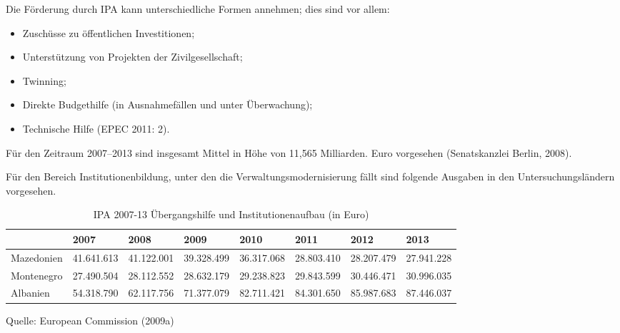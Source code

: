 Die Förderung durch IPA kann unterschiedliche Formen annehmen; dies sind vor allem:
\begin{itemize}
\item Zuschüsse zu öffentlichen Investitionen;
\item Unterstützung von Projekten der Zivilgesellschaft;
\item Twinning;
\item Direkte Budgethilfe (in Ausnahmefällen und unter Überwachung);
\item Technische Hilfe (EPEC 2011: 2).
\end{itemize}
Für den Zeitraum 2007–2013 sind insgesamt Mittel in Höhe von 11,565 Milliarden. Euro vorgesehen (Senatskanzlei Berlin, 2008).\par


Für den Bereich Institutionenbildung, unter den die Verwaltungsmodernisierung fällt sind folgende Ausgaben in den Untersuchungsländern vorgesehen. 
\begin{table}[H]
\caption{ IPA 2007-13 Übergangshilfe und Institutionenaufbau (in Euro)}
\small{
\begin{tabular}{|L{12mm}|R{16mm}|R{16mm}|R{16mm}|R{16mm}|R{16mm}|R{16mm}|R{16mm}|}\hline
&2007&
2008&
2009&
2010&
2011&
2012&
2013\\\hline
Maze\-donien&
41.641.613&
41.122.001&
39.328.499&
36.317.068&
28.803.410&
28.207.479&
27.941.228\\\hline
Monte\-negro&
27.490.504&
28.112.552&
28.632.179&
29.238.823&
29.843.599&
30.446.471&
30.996.035\\\hline
Alba\-nien&
54.318.790&
62.117.756&
71.377.079&
82.711.421&
84.301.650&
85.987.683&
87.446.037\\\hline
\end{tabular}
}
\end{table}
Quelle: European Commission (2009a) 

